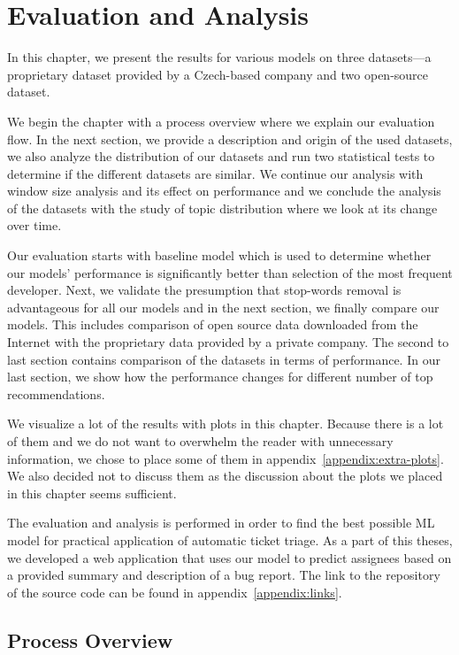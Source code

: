 \chapter{Evaluation and Analysis}
\label{chapter:evaluation}

In this chapter, we present the results for various models on three datasets---a proprietary dataset provided by a Czech-based company and two open-source dataset.

We begin the chapter with a process overview where we explain our evaluation flow. In the next section, we provide a description and origin of the used datasets, we also analyze the distribution of our datasets and run two statistical tests to determine if the different datasets are similar. We continue our analysis with window size analysis and its effect on performance and we conclude the analysis of the datasets with the study of topic distribution where we look at its change over time.

Our evaluation starts with baseline model which is used to determine whether our models' performance is significantly better than selection of the most frequent developer. Next, we validate the presumption that stop-words removal is advantageous for all our models and in the next section, we finally compare our models. This includes comparison of open source data downloaded from the Internet with the proprietary data provided by a private company. The second to last section contains comparison of the datasets in terms of performance. In our last section, we show how the performance changes for different number of top recommendations.

We visualize a lot of the results with plots in this chapter. Because there is a lot of them and we do not want to overwhelm the reader with unnecessary information, we chose to place some of them in appendix~\ref{appendix:extra-plots}. We also decided not to discuss them as the discussion about the plots we placed in this chapter seems sufficient.

The evaluation and analysis is performed in order to find the best possible ML model for practical application of automatic ticket triage. As a part of this theses, we developed a web application that uses our model to predict assignees based on a provided summary and description of a bug report. The link to the repository of the source code can be found in appendix~\ref{appendix:links}.

\section{Process Overview}

